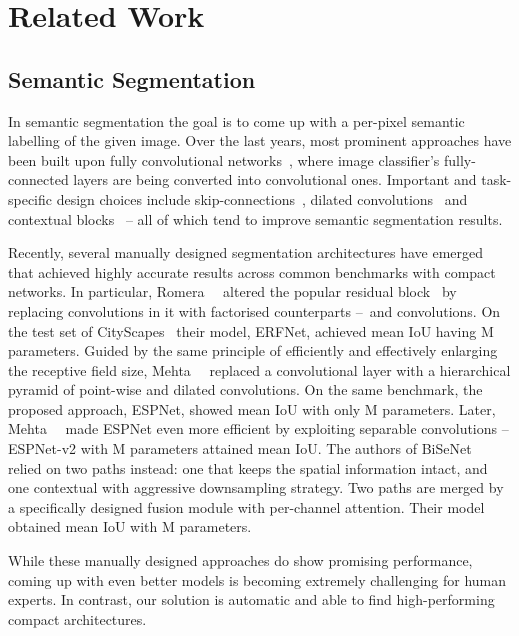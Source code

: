\documentclass[10pt,twocolumn,letterpaper]{article}
\begin{document}
\section{Related Work}

\subsection*{Semantic Segmentation}

In semantic segmentation the goal is to come up with a per-pixel semantic labelling of the given image. Over the last years, most prominent approaches have been built upon fully convolutional networks~\cite{LongSD15}, where image classifier's fully-connected layers are being converted into convolutional ones. Important and task-specific design choices include skip-connections~\cite{LongSD15}, dilated convolutions~\cite{ChenPKMY18} and contextual blocks~\cite{ChenPKMY18, LinMSR17, ZhaoSQWJ17} -- all of which tend to improve semantic segmentation results.

Recently, several manually designed segmentation architectures have emerged that achieved highly accurate results across common benchmarks with compact networks. In particular, Romera~\etal~\cite{RomeraABA18} altered the popular residual block~\cite{HeZRS16} by replacing  convolutions in it with factorised counterparts --~\ie  and  convolutions. On the test set of CityScapes~\cite{CordtsORREBFRS16} their model, ERFNet, achieved  mean IoU having M parameters. Guided by the same principle of efficiently and effectively enlarging the receptive field size, Mehta~\etal~\cite{MehtaRCSH18} replaced a convolutional layer with a hierarchical pyramid of point-wise and dilated convolutions. On the same benchmark, the proposed approach, ESPNet, showed  mean IoU with only M parameters. Later, Mehta~\etal~\cite{abs-1811-11431} made ESPNet even more efficient by exploiting separable convolutions -- ESPNet-v2 with M parameters attained  mean IoU. The authors of BiSeNet~\cite{YuWPGYS18} relied on two paths instead: one that keeps the spatial information intact, and one contextual with aggressive downsampling strategy. Two paths are merged by a specifically designed fusion module with per-channel attention. Their model obtained  mean IoU with M parameters.

While these manually designed approaches do show promising performance, coming up with even better models is becoming extremely challenging for human experts. In contrast, our solution is automatic and able to find high-performing compact architectures.
\end{document}

